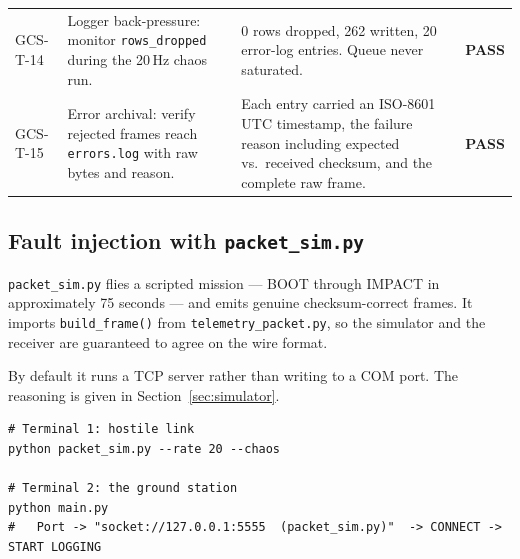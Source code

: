 \documentclass[11pt,a4paper]{article}
\newcommand{\file}[1]{\texttt{#1}}
\newcommand{\code}[1]{\texttt{#1}}
\begin{document}
\begin{longtable}{@{}p{21mm}L{50mm}L{53mm}p{15mm}@{}}
GCS-T-14 & Logger back-pressure: monitor \code{rows\_dropped} during the 20\,Hz chaos run. & 0 rows dropped, 262 written, 20 error-log entries. Queue never saturated. & \textbf{PASS}\\

GCS-T-15 & Error archival: verify rejected frames reach \file{errors.log} with raw bytes and reason. & Each entry carried an ISO-8601 UTC timestamp, the failure reason including expected vs.\ received checksum, and the complete raw frame. & \textbf{PASS}\\

\end{longtable}

\subsection{Fault injection with \texttt{packet\_sim.py}}

\file{packet\_sim.py} flies a scripted mission --- BOOT through IMPACT in
approximately 75 seconds --- and emits genuine checksum-correct frames. It
imports \code{build\_frame()} from \file{telemetry\_packet.py}, so the
simulator and the receiver are guaranteed to agree on the wire format.

By default it runs a TCP server rather than writing to a COM port. The
reasoning is given in Section~\ref{sec:simulator}.

\begin{lstlisting}[style=gcsshell,caption={Running the fault-injection scenario.}]
# Terminal 1: hostile link
python packet_sim.py --rate 20 --chaos

# Terminal 2: the ground station
python main.py
#   Port -> "socket://127.0.0.1:5555  (packet_sim.py)"  -> CONNECT -> START LOGGING
\end{lstlisting}
\end{document}
